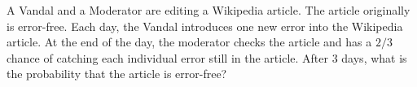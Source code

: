 A Vandal and a Moderator are editing a Wikipedia article.  The article originally is error-free.  Each day, the Vandal introduces one new error into the Wikipedia article.  At the end of the day, the moderator checks the article and has a $ 2/3$ chance of catching each individual error still in the article.  After $ 3$ days, what is the probability that the article is error-free?
